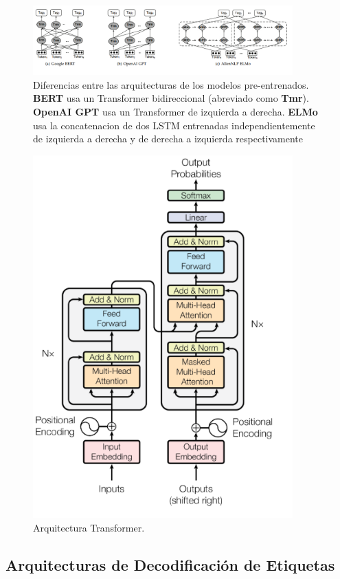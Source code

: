 \begin{figure}[H]
	\centering
	\includegraphics[width = 10cm]{Imagenes/LM.png}
	\caption{Diferencias entre las arquitecturas de los modelos pre-entrenados. \textbf{BERT} usa un Transformer bidireccional (abreviado como \textbf{Tmr}). \textbf{OpenAI GPT} usa un Transformer de izquierda a derecha. \textbf{ELMo} usa la concatenacion de dos LSTM entrenadas independientemente de izquierda a derecha y de derecha a izquierda respectivamente}\label{fig:LM}
\end{figure}

\begin{figure}[h!]
	\centering
	\includegraphics[width = 10cm]{Imagenes/Transformer.png}
	\caption{Arquitectura Transformer.}\label{fig:transformer}
\end{figure}


\subsection{Arquitecturas de Decodificaci\'on de Etiquetas}


